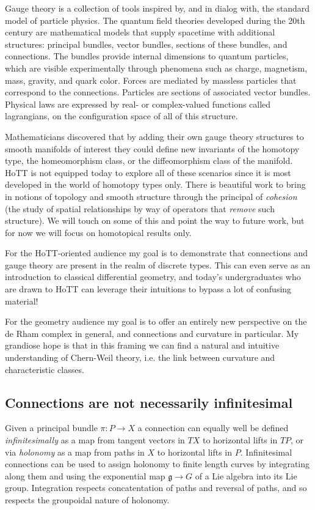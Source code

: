 \documentclass[12pt]{article}
\begin{document}
Gauge theory is a collection of tools inspired by, and in dialog with, the standard model of particle physics. The quantum field theories developed during the 20th century are mathematical models that supply spacetime with additional structures: principal bundles, vector bundles, sections of these bundles, and connections. The bundles provide internal dimensions to quantum particles, which are visible experimentally through phenomena such as charge, magnetism, mass, gravity, and quark color. Forces are mediated by massless particles that correspond to the connections. Particles are sections of associated vector bundles. Physical laws are expressed by real- or complex-valued functions called lagrangians, on the configuration space of all of this structure.

Mathematicians discovered that by adding their own gauge theory structures to smooth manifolds of interest they could define new invariants of the homotopy type, the homeomorphism class, or the diffeomorphism class of the manifold. HoTT is not equipped today to explore all of these scenarios since it is most developed in the world of homotopy types only. There is beautiful work to bring in notions of topology and smooth structure through the principal of \emph{cohesion} (the study of spatial relationships by way of operators that \emph{remove} such structure). We will touch on some of this and point the way to future work, but for now we will focus on homotopical results only. 

For the HoTT-oriented audience my goal is to demonstrate that connections and gauge theory are present in the realm of discrete types. This can even serve as an introduction to classical differential geometry, and today's undergraduates who are drawn to HoTT can leverage their intuitions to bypass a lot of confusing material!

For the geometry audience my goal is to offer an entirely new perspective on the de Rham complex in general, and connections and curvature in particular. My grandiose hope is that in this framing we can find a natural and intuitive understanding of Chern-Weil theory, i.e. the link between curvature and characteristic classes. 


\subsection{Connections are not necessarily infinitesimal}

Given a principal bundle \( \pi:P\to X \) a connection can equally well be defined \emph{infinitesimally} as a map from tangent vectors in \( TX \) to horizontal lifts in \( TP \), or via \emph{holonomy} as a map from paths in \( X \) to horizontal lifts in \( P \). Infinitesimal connections can be used to assign holonomy to finite length curves by integrating along them and using the exponential map \( \mathfrak{g}\to G \) of a Lie algebra into its Lie group. Integration respects concatentation of paths and reversal of paths, and so respects the groupoidal nature of holonomy.
\end{document}
